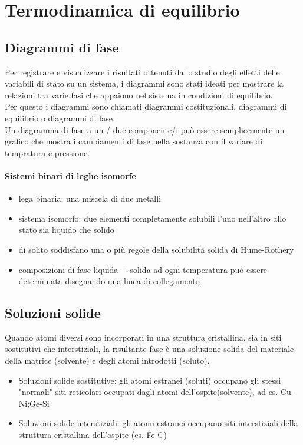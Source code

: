 \documentclass{article}
\begin{document}
\newpage

\section{Termodinamica di equilibrio}
\subsection{Diagrammi di fase}
Per registrare e visualizzare i risultati ottenuti dallo studio degli effetti delle variabili di stato su un sistema, i diagrammi sono stati ideati per mostrare la relazioni tra varie fasi che appaiono nel sistema in condizioni di equilibrio. \\
Per questo i diagrammi sono chiamati diagrammi costituzionali, diagrammi di equilibrio o diagrammi di fase.\\
Un diagramma di fase a un / due componente/i può essere semplicemente un grafico che mostra i cambiamenti di fase nella sostanza con il variare di tempratura e pressione.


\paragraph{Sistemi binari di leghe isomorfe}
\begin{itemize}
    \item lega binaria: una miscela di due metalli
    \item sistema isomorfo: due elementi completamente solubili l'uno nell'altro allo stato sia liquido che solido
    \item di solito soddisfano una o più regole della solubilità solida di Hume-Rothery
    \item composizioni di fase liquida + solida ad ogni temperatura può essere determinata disegnando una linea di collegamento
\end{itemize}

\subsection{Soluzioni solide}
Quando atomi diversi sono incorporati in una struttura cristallina, sia in siti sostitutivi che interstiziali, la risultante fase è una soluzione solida del materiale della matrice (solvente) e degli atomi introdotti (soluto).

\begin{itemize}
    \item Soluzioni solide sostitutive: gli atomi estranei (soluti) occupano gli stessi "normali" siti reticolari occupati dagli atomi dell'ospite(solvente), ad es. Cu-Ni;Ge-Si
    \item Soluzioni solide interstiziali: gli atomi estranei occupano siti interstiziali della struttura cristallina dell'ospite (es. Fe-C)
\end{itemize}
\end{document}
